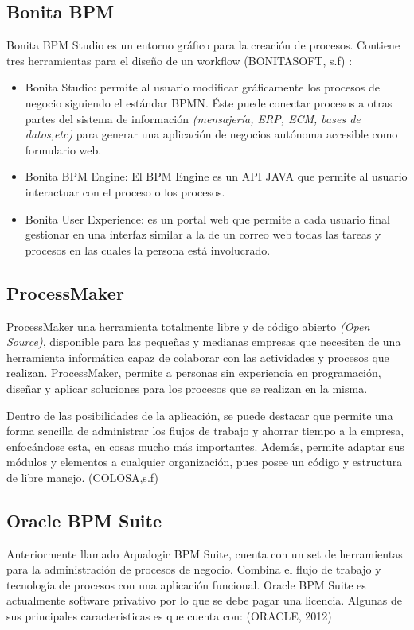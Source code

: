 		\subsection{Bonita BPM}
		Bonita BPM Studio es un entorno gráfico para la creación de procesos. Contiene tres herramientas para el diseño de un workflow (BONITASOFT, s.f) :
		\begin{itemize}
			\item Bonita Studio: permite al usuario modificar gráficamente los procesos de negocio siguiendo el estándar BPMN. Éste puede conectar procesos a otras partes del sistema de información \textit{(mensajería, ERP, ECM, bases de datos,etc)} para generar una aplicación de negocios autónoma accesible como formulario web. 
			\item Bonita BPM Engine: El BPM Engine es un  API  JAVA que permite al usuario interactuar con el proceso o los procesos.
			\item Bonita User Experience: es un portal web que permite a cada usuario final gestionar en una interfaz similar a la de un correo web todas las tareas y procesos en las cuales la persona está involucrado.
		\end{itemize}
		
		\subsection{ProcessMaker}
		ProcessMaker una herramienta totalmente libre y de código abierto \textit{(Open Source)}, disponible para las pequeñas y medianas empresas que necesiten de una herramienta informática capaz de colaborar con las actividades y procesos que realizan. ProcessMaker, permite a personas sin experiencia en programación, diseñar y aplicar soluciones para los procesos que se realizan en la misma.
		\newline
		\par
		Dentro de las posibilidades de la aplicación, se puede destacar que permite una forma sencilla de administrar los flujos de trabajo y ahorrar tiempo a la empresa, enfocándose esta, en cosas mucho más importantes. Además, permite adaptar sus módulos y elementos a cualquier organización, pues posee un código y estructura de libre manejo. (COLOSA,s.f)
		
		\subsection{Oracle BPM Suite}
		Anteriormente llamado Aqualogic BPM Suite, cuenta con un set de herramientas para la administración de procesos de negocio. Combina el flujo de trabajo y tecnología de procesos con una aplicación funcional. Oracle BPM Suite es actualmente software privativo por lo que se debe pagar una licencia. Algunas de sus principales caracteristicas es que cuenta con: (ORACLE, 2012)
		
